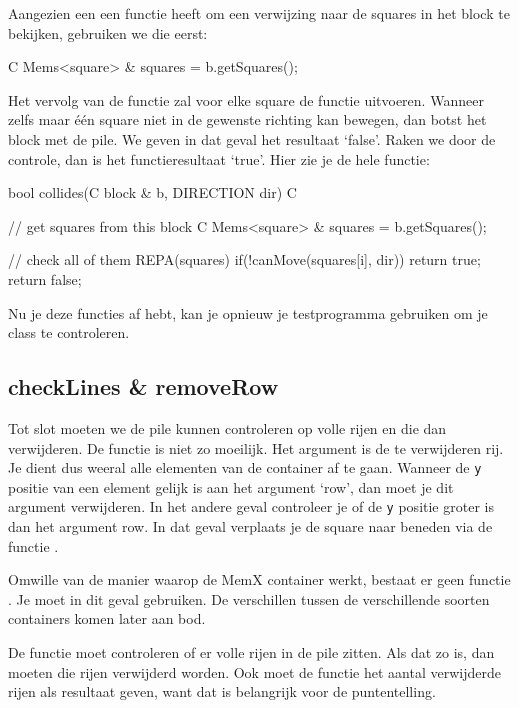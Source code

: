 Aangezien een  een functie heeft om een verwijzing naar de squares in het block te bekijken, gebruiken we die eerst:

\begin{code}
C Mems<square> & squares = b.getSquares();
\end{code}

Het vervolg van de functie zal voor elke square de functie  uitvoeren. Wanneer zelfs maar \'e\'en square niet in de gewenste richting kan bewegen, dan botst het block met de pile. We geven in dat geval het resultaat `false'. Raken we door de controle, dan is het functieresultaat `true'. Hier zie je de hele functie:

\begin{code}
bool collides(C block & b, DIRECTION dir) C
{
	// get squares from this block
	C Mems<square> & squares = b.getSquares();
	
	// check all of them
	REPA(squares)
	{
		 if(!canMove(squares[i], dir))
		 {
				return true;
		 }
	}
	return false;
}
\end{code}

Nu je deze functies af hebt, kan je opnieuw je testprogramma gebruiken om je class te controleren.

\subsection{checkLines \& removeRow}
Tot slot moeten we de pile kunnen controleren op volle rijen en die dan verwijderen. De functie  is niet zo moeilijk. Het argument is de te verwijderen rij. Je dient dus weeral alle elementen van de container af te gaan. Wanneer de \verb|y| positie van een element gelijk is aan het argument `row', dan moet je dit argument verwijderen. In het andere geval controleer je of de \verb|y| positie groter is dan het argument row. In dat geval verplaats je de square naar beneden via de functie .

\begin{note}
Omwille van de manier waarop de MemX container werkt, bestaat er geen functie . Je moet in dit geval  gebruiken. De verschillen tussen de verschillende soorten containers komen later aan bod. 
\end{note}

De functie  moet controleren of er volle rijen in de pile zitten. Als dat zo is, dan moeten die rijen verwijderd worden. Ook moet de functie het aantal verwijderde rijen als resultaat geven, want dat is belangrijk voor de puntentelling.

